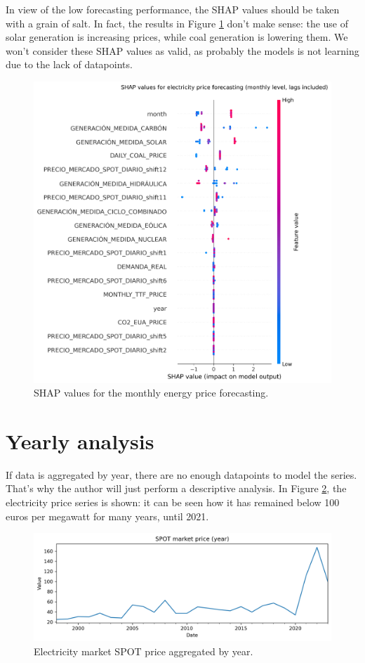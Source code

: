 In view of the low forecasting performance, the SHAP values should be taken with a grain of salt. In fact, the results in Figure \ref{fig:shap-monthly} don't make sense: the use of solar generation is increasing prices, while coal generation is lowering them. We won't consider these SHAP values as valid, as probably the models is not learning due to the lack of datapoints.

\begin{figure}[H]
\centering
    \centering
    \includegraphics[width=0.7\linewidth]{images/analysis/shap-monthly}
    \caption{SHAP values for the monthly energy price forecasting.}
    \label{fig:shap-monthly}
\end{figure}

\newpage
\section{Yearly analysis}

If data is aggregated by year, there are no enough datapoints to model the series. That's why the author will just perform a descriptive analysis. In Figure \ref{fig:spot-yearly}, the electricity price series is shown: it can be seen how it has remained below 100 euros per megawatt for many years, until 2021.

\begin{figure}[H]
\centering
    \centering
    \includegraphics[width=0.7\linewidth]{images/analysis/spot-yearly}
    \caption{Electricity market SPOT price aggregated by year.}
    \label{fig:spot-yearly}
\end{figure}

